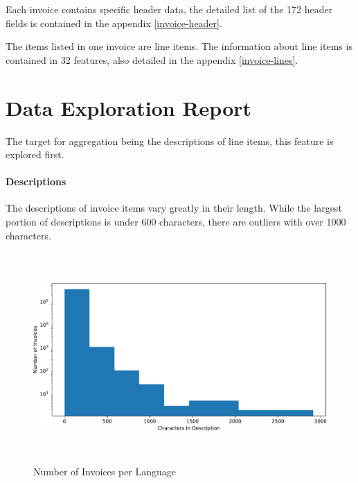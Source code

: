 Each invoice contains specific header data, the detailed list of the 172 header fields is contained in the appendix \ref{invoice-header}. 

The items listed in one invoice are line items. The information about line items is contained in 32 features, also detailed in the appendix \ref{invoice-lines}.

\section{Data Exploration Report}

The target for aggregation being the descriptions of line items, this feature is explored first.

\paragraph{Descriptions}
The descriptions of invoice items vary greatly in their length. While the largest portion of descriptions is under 600 characters, there are outliers with over 1000 characters. 
\begin{figure}[ht]
	\centering
	\includegraphics[height=8cm]{Bilder/hist_description.pdf}
	\caption{Number of Invoices per Language}
	\label{fig:languages-bar}
\end{figure}

